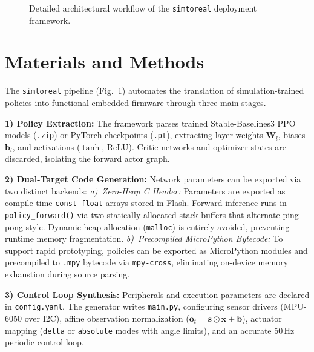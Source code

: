 \documentclass[10pt, conference, a4paper]{IEEEtran}
\begin{document}
\begin{figure}[htbp]
\caption{Detailed architectural workflow of the \texttt{simtoreal} deployment framework.}
\label{fig:architecture}
\end{figure}

\section{Materials and Methods}
\label{sec:methodology}

The \texttt{simtoreal} pipeline (Fig.~\ref{fig:architecture}) automates the translation of simulation-trained policies into functional embedded firmware through three main stages.

\textbf{1) Policy Extraction:} The framework parses trained Stable-Baselines3 PPO models (\texttt{.zip}) or PyTorch checkpoints (\texttt{.pt}), extracting layer weights $\mathbf{W}_l$, biases $\mathbf{b}_l$, and activations ($\tanh$, $\text{ReLU}$). Critic networks and optimizer states are discarded, isolating the forward actor graph.

\textbf{2) Dual-Target Code Generation:} Network parameters can be exported via two distinct backends:
\emph{a)~Zero-Heap C Header:} Parameters are exported as compile-time \texttt{const float} arrays stored in Flash. Forward inference runs in \texttt{policy\_forward()} via two statically allocated stack buffers that alternate ping-pong style. Dynamic heap allocation (\texttt{malloc}) is entirely avoided, preventing runtime memory fragmentation.
\emph{b)~Precompiled MicroPython Bytecode:} To support rapid prototyping, policies can be exported as MicroPython modules and precompiled to \texttt{.mpy} bytecode via \texttt{mpy-cross}, eliminating on-device memory exhaustion during source parsing.

\textbf{3) Control Loop Synthesis:} Peripherals and execution parameters are declared in \texttt{config.yaml}. The generator writes \texttt{main.py}, configuring sensor drivers (MPU-6050 over I2C), affine observation normalization ($\mathbf{o}_t = \mathbf{s} \odot \mathbf{x} + \mathbf{b}$), actuator mapping (\texttt{delta} or \texttt{absolute} modes with angle limits), and an accurate 50\,Hz periodic control loop.
\end{document}
